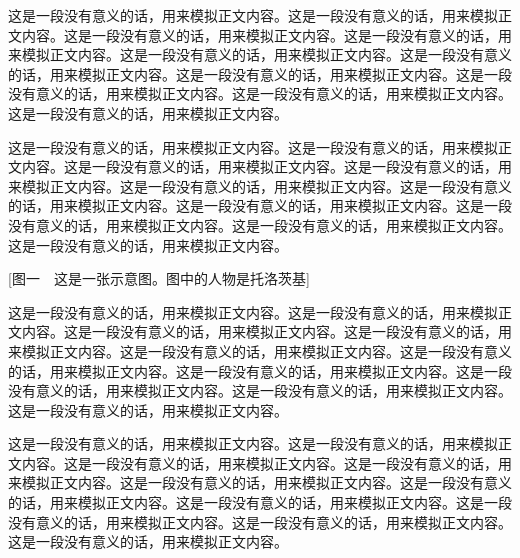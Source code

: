 这是一段没有意义的话，用来模拟正文内容。这是一段没有意义的话，用来模拟正文内容。这是一段没有意义的话，用来模拟正文内容。这是一段没有意义的话，用来模拟正文内容。这是一段没有意义的话，用来模拟正文内容。这是一段没有意义的话，用来模拟正文内容。这是一段没有意义的话，用来模拟正文内容。这是一段没有意义的话，用来模拟正文内容。这是一段没有意义的话，用来模拟正文内容。这是一段没有意义的话，用来模拟正文内容。

这是一段没有意义的话，用来模拟正文内容。这是一段没有意义的话，用来模拟正文内容。这是一段没有意义的话，用来模拟正文内容。这是一段没有意义的话，用来模拟正文内容。这是一段没有意义的话，用来模拟正文内容。这是一段没有意义的话，用来模拟正文内容。这是一段没有意义的话，用来模拟正文内容。这是一段没有意义的话，用来模拟正文内容。这是一段没有意义的话，用来模拟正文内容。这是一段没有意义的话，用来模拟正文内容。

[图一　这是一张示意图。图中的人物是托洛茨基]

这是一段没有意义的话，用来模拟正文内容。这是一段没有意义的话，用来模拟正文内容。这是一段没有意义的话，用来模拟正文内容。这是一段没有意义的话，用来模拟正文内容。这是一段没有意义的话，用来模拟正文内容。这是一段没有意义的话，用来模拟正文内容。这是一段没有意义的话，用来模拟正文内容。这是一段没有意义的话，用来模拟正文内容。这是一段没有意义的话，用来模拟正文内容。这是一段没有意义的话，用来模拟正文内容。


这是一段没有意义的话，用来模拟正文内容。这是一段没有意义的话，用来模拟正文内容。这是一段没有意义的话，用来模拟正文内容。这是一段没有意义的话，用来模拟正文内容。这是一段没有意义的话，用来模拟正文内容。这是一段没有意义的话，用来模拟正文内容。这是一段没有意义的话，用来模拟正文内容。这是一段没有意义的话，用来模拟正文内容。这是一段没有意义的话，用来模拟正文内容。这是一段没有意义的话，用来模拟正文内容。

\hr{}

